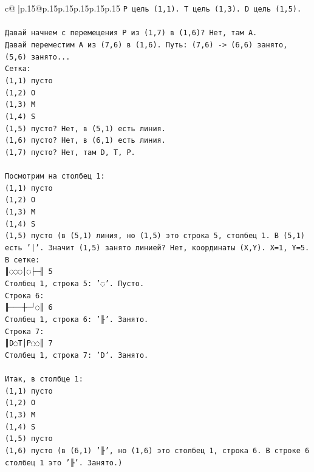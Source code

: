 \documentclass{article}
\begin{document}
{\begin{supertabular}{c@{$\;$}|p{.15\linewidth}@{}p{.15\linewidth}p{.15\linewidth}p{.15\linewidth}p{.15\linewidth}p{.15\linewidth}}
{{{\texttt{P цель (1,1). T цель (1,3). D цель (1,5).} \\
\\ 
\texttt{Давай начнем с перемещения P из (1,7) в (1,6)? Нет, там A.} \\
\texttt{Давай переместим A из (7,6) в (1,6). Путь: (7,6) {-}> (6,6) занято, (5,6) занято...} \\
\texttt{Сетка:} \\
\texttt{(1,1) пусто} \\
\texttt{(1,2) O} \\
\texttt{(1,3) M} \\
\texttt{(1,4) S} \\
\texttt{(1,5) пусто? Нет, в (5,1) есть линия.} \\
\texttt{(1,6) пусто? Нет, в (6,1) есть линия.} \\
\texttt{(1,7) пусто? Нет, там D, T, P.} \\
\\ 
\texttt{Посмотрим на столбец 1:} \\
\texttt{(1,1) пусто} \\
\texttt{(1,2) O} \\
\texttt{(1,3) M} \\
\texttt{(1,4) S} \\
\texttt{(1,5) пусто (в (5,1) линия, но (1,5) это строка 5, столбец 1. В (5,1) есть '|'. Значит (1,5) занято линией? Нет, координаты (X,Y). X=1, Y=5. В сетке:} \\
\texttt{║◌◌◌│◌├─╢ 5} \\
\texttt{Столбец 1, строка 5: '◌'. Пусто.} \\
\texttt{Строка 6:} \\
\texttt{╟───┼─┘◌║ 6} \\
\texttt{Столбец 1, строка 6: '╟'. Занято.} \\
\texttt{Строка 7:} \\
\texttt{║D◌T│P◌◌║ 7} \\
\texttt{Столбец 1, строка 7: 'D'. Занято.} \\
\\ 
\texttt{Итак, в столбце 1:} \\
\texttt{(1,1) пусто} \\
\texttt{(1,2) O} \\
\texttt{(1,3) M} \\
\texttt{(1,4) S} \\
\texttt{(1,5) пусто} \\
\texttt{(1,6) пусто (в (6,1) '╟', но (1,6) это столбец 1, строка 6. В строке 6 столбец 1 это '╟'. Занято.)} \\
}}}
\end{supertabular}}
\end{document}
